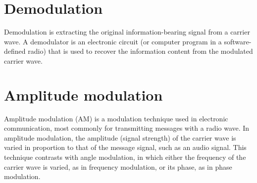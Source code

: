 \documentclass[journal,compsoc]{IEEEtran}
\begin{document}
\section{Demodulation}
Demodulation is extracting the original information-bearing signal from a carrier wave. A demodulator is an electronic circuit (or computer program in a software-defined radio) that is used to recover the information content from the modulated carrier wave.

\section{Amplitude modulation}
Amplitude modulation (AM) is a modulation technique used in electronic communication, most commonly for transmitting messages with a radio wave. In amplitude modulation, the amplitude (signal strength) of the carrier wave is varied in proportion to that of the message signal, such as an audio signal. This technique contrasts with angle modulation, in which either the frequency of the carrier wave is varied, as in frequency modulation, or its phase, as in phase modulation.


\vspace{12pt}
\end{document}
